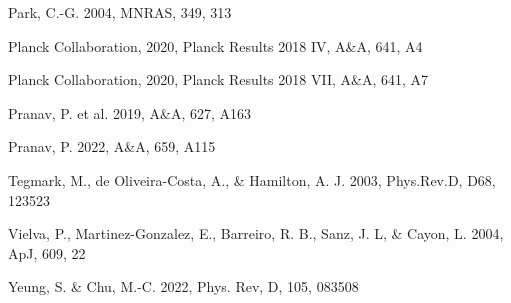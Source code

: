 \documentclass{aa}
\begin{document}
\begin{thebibliography}{}
 Park, C.-G. 2004, MNRAS, 349, 313

 Planck Collaboration, 2020, Planck Results 2018 IV, A\&A, 641, A4

 Planck Collaboration, 2020, Planck Results 2018 VII, A\&A, 641, A7

 Pranav, P. et al. 2019, A\&A, 627, A163

 Pranav, P. 2022, A\&A, 659, A115

 Tegmark, M., de Oliveira-Costa, A., \& Hamilton, A. J. 2003, Phys.Rev.D, D68, 123523

 Vielva, P., Martinez-Gonzalez, E., Barreiro, R. B., Sanz, J. L, \& Cayon, L. 2004, ApJ, 609, 22

 Yeung, S. \& Chu,  M.-C. 2022, Phys. Rev, D, 105, 083508
  
\end{thebibliography}
\end{document}
